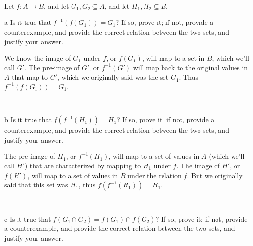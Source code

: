 \documentclass{article}
\begin{document}
\
\hline
\section{}

\begin{problem*}
Let $f:A\to B$, and let $G_1,G_2\subseteq A$, and let $H_1,H_2\subseteq B$.
\end{problem*}


\begin{problem} a
Is it true that $f^{-1}(f(G_1))=G_1$? If so, prove it; if not, provide a counterexample, and provide the correct relation between the two sets, and justify your answer. 
\end{problem}

We know the image of $G_{1}$ under $f$, or $f( G_{1})$, will map to a set in $B$, which we'll call $G'$. The pre-image of $G'$, or $f^{-1}( G')$ will map back to the original values in $A$ that map to $G'$, which we originally said was the set $G_{1}$. Thus $f^{-1} (f(G_{1} ))=G_{1}$.


\

\begin{problem} b
Is it true that $f(f^{-1}(H_1))=H_1$? If so, prove it; if not, provide a counterexample, and provide the correct relation between the two sets, and justify your answer.
\end{problem}

The pre-image of $H_{1}$, or $f^{-1}( H_{1})$, will map to a set of values in $A$ (which we'll call $H'$) that are characterized by mapping to $H_{1}$ under $f$. The image of $H'$, or $f( H')$, will map to a set of values in $B$ under the relation $f$. But we originally said that this set was $H_{1}$, thus $f(f^{-1} (H_{1} ))=H_{1}$.

\

\begin{problem} c
Is it true that $f(G_1\cap G_2)=f(G_1)\cap f(G_2)$? If so, prove it; if not, provide a counterexample, and provide the correct relation between the two sets, and justify your answer.
\end{problem}
\end{document}
